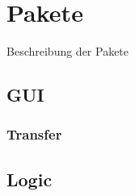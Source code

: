 \section{Pakete}
Beschreibung der Pakete
\subsection{GUI}

\subsubsection{Transfer}

\subsection{Logic}

